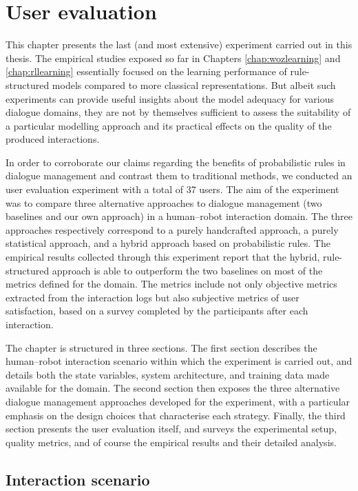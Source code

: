 \chapter{User evaluation}
\label{chap:user-evaluation}

This chapter presents the last (and most extensive) experiment carried out in this thesis. The empirical studies exposed so far in Chapters \ref{chap:wozlearning} and \ref{chap:rllearning} essentially focused on the learning performance of rule-structured models compared to more classical representations. But albeit such experiments can provide useful insights about the model adequacy for various dialogue domains, they are not by themselves sufficient to assess the suitability of a particular modelling approach and its practical effects on the quality of the produced interactions. 

In order to corroborate our claims regarding the benefits of probabilistic rules in dialogue management and contrast them to traditional methods, we conducted an user evaluation experiment with a total of 37 users. The aim of the experiment was to compare three alternative approaches to dialogue management (two baselines and our own approach) in a human--robot interaction domain.  The three approaches respectively correspond to a purely handcrafted approach, a purely statistical approach, and a hybrid approach based on probabilistic rules. The empirical results collected through this experiment report that the  hybrid, rule-structured approach is able to outperform the two baselines on most of the metrics defined for the domain.  The metrics include not only objective metrics extracted from the interaction logs but also subjective metrics of user satisfaction, based on a survey completed by the participants after each interaction. 


The chapter is structured in three sections.  The first section describes the human--robot interaction scenario within which the experiment is carried out, and details both the state variables, system architecture, and training data made available for the domain. The second section then exposes the three alternative dialogue management approaches developed for the experiment, with a particular emphasis on the design choices that characterise each strategy.   Finally, the third section presents the user evaluation itself, and surveys the experimental setup, quality metrics, and of course the empirical results and their detailed analysis. 

\section{Interaction scenario}

